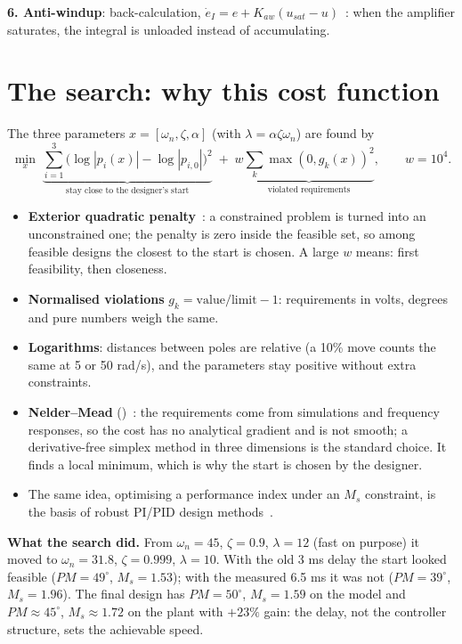 \documentclass[10pt,a4paper]{article}
\newcommand{\code}[1]{\texttt{\detokenize{#1}}}
\begin{document}
\textbf{6. Anti-windup}: back-calculation, $\dot e_I=e+K_{aw}(u_{sat}-u)$~\cite{astrom06}: when the amplifier saturates, the
integral is unloaded instead of accumulating.

\section{The search: why this cost function}

The three parameters $x=[\omega_n,\zeta,\alpha]$ (with $\lambda=\alpha\zeta\omega_n$) are found by
\begin{equation}
  \min_x\;\underbrace{\sum_{i=1}^3\bigl(\log|p_i(x)|-\log|p_{i,0}|\bigr)^2}_{\text{stay close to the designer's start}}
  \;+\;w\underbrace{\sum_k\max(0,g_k(x))^2}_{\text{violated requirements}},\qquad w=10^4 .
\end{equation}
\begin{itemize}
  \item \textbf{Exterior quadratic penalty}~\cite{nocedal06}: a constrained problem is turned into an unconstrained one;
        the penalty is zero inside the feasible set, so among feasible designs the closest to the start is chosen. A large $w$
        means: first feasibility, then closeness.
  \item \textbf{Normalised violations} $g_k=\text{value}/\text{limit}-1$: requirements in volts, degrees and pure numbers weigh
        the same.
  \item \textbf{Logarithms}: distances between poles are relative (a 10\% move counts the same at 5 or 50 rad/s), and the
        parameters stay positive without extra constraints.
  \item \textbf{Nelder--Mead} (\code{fminsearch})~\cite{nelder65,lagarias98}: the requirements come from simulations and
        frequency responses, so the cost has no analytical gradient and is not smooth; a derivative-free simplex method in
        three dimensions is the standard choice. It finds a local minimum, which is why the start is chosen by the designer.
  \item The same idea, optimising a performance index under an $M_s$ constraint, is the basis of robust PI/PID design
        methods~\cite{astrom98,panagopoulos02,garpinger08}.
\end{itemize}

\textbf{What the search did.} From $\omega_n=45$, $\zeta=0.9$, $\lambda=12$ (fast on purpose) it moved to
$\omega_n=31.8$, $\zeta=0.999$, $\lambda=10$. With the old 3 ms delay the start looked feasible ($PM=49^\circ$, $M_s=1.53$);
with the measured 6.5 ms it was not ($PM=39^\circ$, $M_s=1.96$). The final design has $PM=50^\circ$, $M_s=1.59$ on the model
and $PM\approx45^\circ$, $M_s\approx1.72$ on the plant with $+23\%$ gain: the delay, not the controller structure, sets the
achievable speed.
\end{document}
